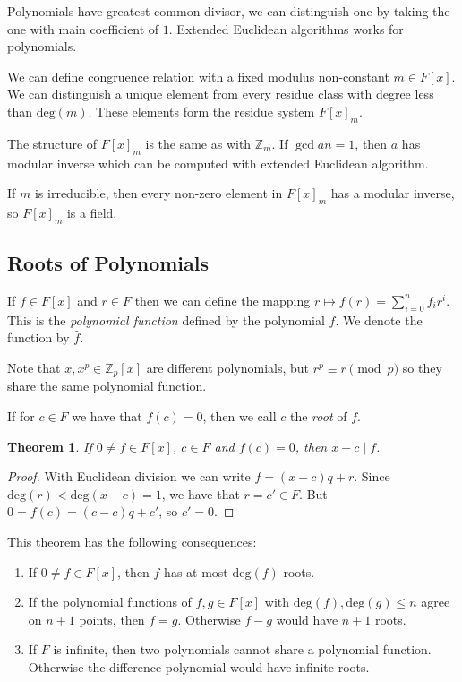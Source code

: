 \documentclass{article}
\newcommand{\Z}{\mathbb{Z}}
\newtheorem{theorem}{Theorem}
\begin{document}
Polynomials have greatest common divisor, we can distinguish one by taking the one with main coefficient of $1$.
Extended Euclidean algorithms works for polynomials.

We can define congruence relation with a fixed modulus non-constant $m \in F[x]$.
We can distinguish a unique element from every residue class with degree less than $\mathrm{deg}(m)$.
These elements form the residue system $F[x]_m$.

The structure of $F[x]_m$ is the same as with $\Z_m$.
If $\gcd{a}{n}=1$, then $a$ has modular inverse which can be computed with extended Euclidean algorithm.

If $m$ is irreducible, then every non-zero element in $F[x]_m$ has a modular inverse, so $F[x]_m$ is a field.

\subsection{Roots of Polynomials}

If $f \in F[x]$ and $r \in F$ then we can define the mapping $r \mapsto f(r) = \sum_{i=0}^n f_i r^i$.
This is the \emph{polynomial function} defined by the polynomial $f$.
We denote the function by $\hat{f}$.

Note that $x, x^p \in \Z_p[x]$ are different polynomials, but $r^p \equiv r \pmod{p}$ so they share the same polynomial function.

If for $c \in F$ we have that $f(c) = 0$, then we call $c$ the \emph{root} of $f$.

\begin{theorem}
    If $0 \neq f \in F[x]$, $c \in F$ and $f(c) = 0$, then $x-c \mid f$.
\end{theorem}
\begin{proof}
    With Euclidean division we can write $f=(x-c)q + r$.
    Since $\mathrm{deg}(r) < \mathrm{deg}(x-c) = 1$, we have that $r=c' \in F$.
    But $0 = f(c) = (c-c)q + c'$, so $c'=0$.
\end{proof}

This theorem has the following consequences:
\begin{enumerate}
    \item If $0 \neq f \in F[x]$, then $f$ has at most $\mathrm{deg}(f)$ roots.
    \item If the polynomial functions of $f,g \in F[x]$ with $\mathrm{deg}(f), \mathrm{deg}(g) \le n$ agree on $n+1$ points, then $f=g$. Otherwise $f-g$ would have $n+1$ roots.
    \item If $F$ is infinite, then two polynomials cannot share a polynomial function. Otherwise the difference polynomial would have infinite roots.
\end{enumerate}
\end{document}
